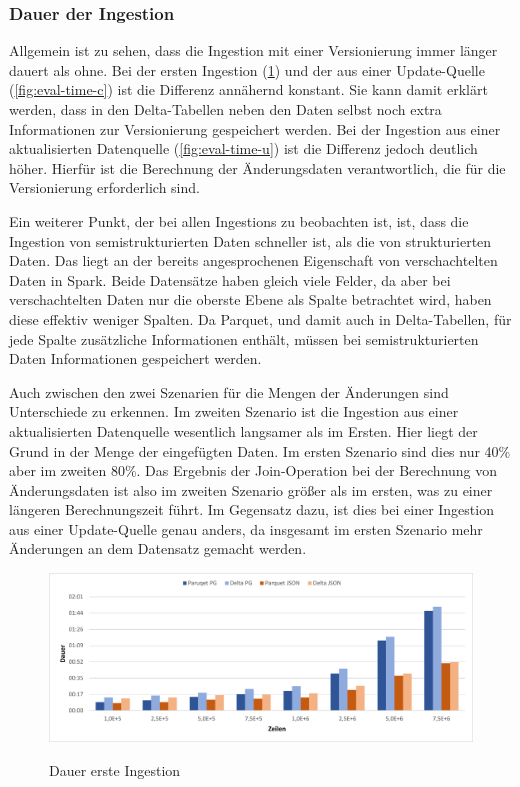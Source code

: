 \subsubsection{Dauer der Ingestion}

Allgemein ist zu sehen, dass die Ingestion mit einer Versionierung immer länger dauert als ohne.
Bei der ersten Ingestion (\cref{fig:eval-time-i}) und der aus einer Update-Quelle (\cref{fig:eval-time-c}) ist die Differenz annähernd konstant.
Sie kann damit erklärt werden, dass in den Delta-Tabellen neben den Daten selbst noch extra Informationen zur Versionierung gespeichert werden.
Bei der Ingestion aus einer aktualisierten Datenquelle (\cref{fig:eval-time-u}) ist die Differenz jedoch deutlich höher.
Hierfür ist die Berechnung der Änderungsdaten verantwortlich, die für die Versionierung erforderlich sind.

Ein weiterer Punkt, der bei allen Ingestions zu beobachten ist, ist, dass die Ingestion von semistrukturierten Daten schneller ist, als die von strukturierten Daten.
Das liegt an der bereits angesprochenen Eigenschaft von verschachtelten Daten in Spark.
Beide Datensätze haben gleich viele Felder, da aber bei verschachtelten Daten nur die oberste Ebene als Spalte betrachtet wird, haben diese effektiv weniger Spalten.
Da Parquet, und damit auch in Delta-Tabellen, für jede Spalte zusätzliche Informationen enthält, müssen bei semistrukturierten Daten Informationen gespeichert werden.

Auch zwischen den zwei Szenarien für die Mengen der Änderungen sind Unterschiede zu erkennen.
Im zweiten Szenario ist die Ingestion aus einer aktualisierten Datenquelle wesentlich langsamer als im Ersten.
Hier liegt der Grund in der Menge der eingefügten Daten.
Im ersten Szenario sind dies nur 40\% aber im zweiten 80\%.
Das Ergebnis der Join-Operation bei der Berechnung von Änderungsdaten ist also im zweiten Szenario größer als im ersten, was zu einer längeren Berechnungszeit führt.
Im Gegensatz dazu, ist dies bei einer Ingestion aus einer Update-Quelle genau anders, da insgesamt im ersten Szenario mehr Änderungen an dem Datensatz gemacht werden.


\begin{figure}
    \centering
    \caption{Dauer erste Ingestion}
    \includegraphics[width=\textwidth]{Grafiken/Evaluierung/Zeit-Initial}
    \label{fig:eval-time-i}
\end{figure}

